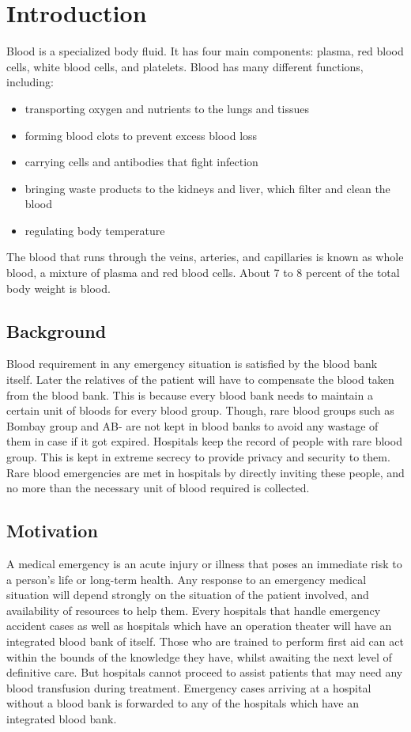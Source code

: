 \setcounter{equation}{0}
\chapter{Introduction}
Blood is a specialized body fluid. It has four main components: plasma, red blood cells, white blood cells, and platelets. Blood has many different functions, including:

\begin{itemize}
\item transporting oxygen and nutrients to the lungs and tissues
\item forming blood clots to prevent excess blood loss
\item carrying cells and antibodies that fight infection
\item bringing waste products to the kidneys and liver, which filter and clean the blood
\item regulating body temperature
\end{itemize}
The blood that runs through the veins, arteries, and capillaries is known as whole blood, a mixture of plasma and red blood cells. About 7 to 8 percent of the total body weight is blood.\par 
\setlength{\parskip}{2ex}
\section{Background}
\noindent Blood requirement in any emergency situation is satisfied by the blood bank itself. Later the relatives of the patient will have to compensate the blood taken from the blood bank. This is because every blood bank needs to maintain a certain unit of bloods for every blood group. Though, rare blood groups such as Bombay group and AB- are not kept in blood banks to avoid any wastage of them in case if it got expired. Hospitals keep the record of people with rare blood group. This is kept in extreme secrecy to provide privacy and security to them. Rare blood emergencies are met in hospitals by directly inviting these people, and no more than the necessary unit  of blood required is collected. 
\section{Motivation}
\noindent A medical emergency is an acute injury or illness that poses an immediate risk to a person's life or long-term health. Any response to an emergency medical situation will depend strongly on the situation of the patient involved, and availability of resources to help them. Every hospitals that handle emergency accident cases as well as hospitals which have an operation theater will have an integrated blood bank of itself. Those who are trained to perform first aid can act within the bounds of the knowledge they have, whilst awaiting the next level of definitive care. But hospitals cannot proceed to assist patients that may need any blood transfusion during treatment. Emergency cases arriving at a hospital without a blood bank is forwarded to any of the hospitals which have an integrated blood bank.

